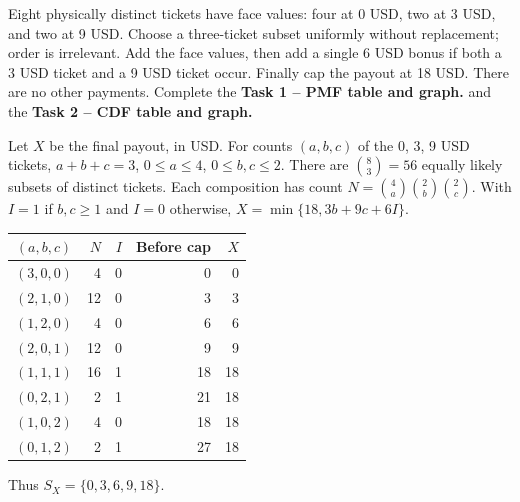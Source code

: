 \medskip
{}
Eight physically distinct tickets have face values: four at 0 USD, two at 3 USD,
and two at 9 USD. Choose a three-ticket subset uniformly without replacement;
order is irrelevant. Add the face values, then add a single 6 USD bonus if
both a 3 USD ticket and a 9 USD ticket occur. Finally cap the payout at 18 USD.
There are no other payments. Complete the \textbf{Task 1 -- PMF table and graph.} and the \textbf{Task 2 -- CDF table and graph.}
\par
Let $X$ be the final payout, in USD.
For counts $(a,b,c)$ of the 0, 3, 9 USD tickets,
$a+b+c=3$, $0\leq a\leq4$, $0\leq b,c\leq2$.
There are $\binom83=56$ equally likely subsets of distinct tickets.
Each composition has count
$N=\binom4a\binom2b\binom2c$.
With $I=1$ if $b,c\geq1$ and $I=0$ otherwise,
$X=\min\{18,3b+9c+6I\}$.
\par\noindent
\begin{minipage}[t]{.40\linewidth}
\vspace{0pt}\centering
\begin{tabular}{@{}crrrr@{}}\toprule
$(a,b,c)$ & $N$ & $I$ & Before cap & $X$\\\midrule
$(3,0,0)$ & 4 & 0 & 0 & 0\\
$(2,1,0)$ & 12 & 0 & 3 & 3\\
$(1,2,0)$ & 4 & 0 & 6 & 6\\
$(2,0,1)$ & 12 & 0 & 9 & 9\\
$(1,1,1)$ & 16 & 1 & 18 & 18\\
$(0,2,1)$ & 2 & 1 & 21 & 18\\
$(1,0,2)$ & 4 & 0 & 18 & 18\\
$(0,1,2)$ & 2 & 1 & 27 & 18\\\bottomrule
\end{tabular}
\par\raggedright Thus $S_X=\{0,3,6,9,18\}$.
\end{minipage}\hfill
\begin{minipage}[t]{.57\linewidth}
\vspace{0pt}\centering
{}
\end{minipage}\par
